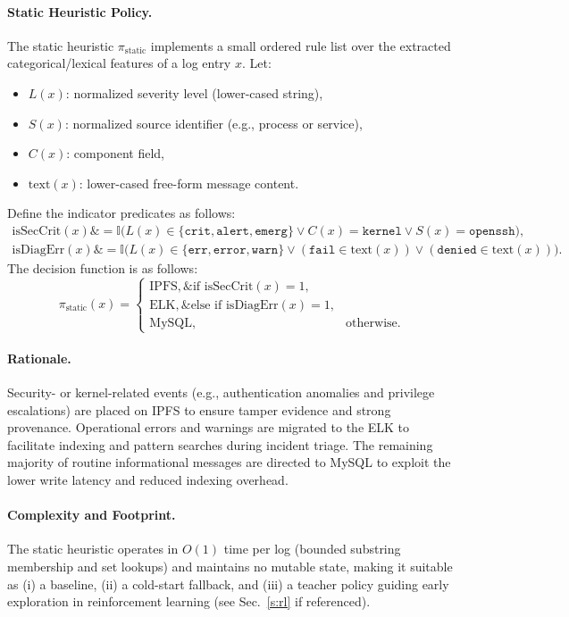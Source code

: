 \paragraph{Static Heuristic Policy.}
The static heuristic $\pi_{\text{static}}$ implements a small ordered rule list over the extracted categorical/lexical features of a log entry $x$. Let:
\begin{itemize}
  \item $L(x)$: normalized severity level (lower-cased string),
  \item $S(x)$: normalized source identifier (e.g., process or service),
  \item $C(x)$: component field,
  \item $\mathrm{text}(x)$: lower-cased free-form message content.
\end{itemize}
Define the indicator predicates as follows:
\[
\begin{aligned}
\mathrm{isSecCrit}(x)\&= \mathbb{I}\big(L(x) \in \{\texttt{crit},\texttt{alert},\texttt{emerg}\} \lor C(x)=\texttt{kernel} \lor S(x)=\texttt{openssh}\big),\\
\mathrm{isDiagErr}(x)\&= \mathbb{I}\big(L(x)\in\{\texttt{err},\texttt{error},\texttt{warn}\} \lor (\texttt{fail} \in \mathrm{text}(x)) \lor (\texttt{denied}\in \mathrm{text}(x))\big).
\end{aligned}
\]
The decision function is as follows:
\[
\pi_{\text{static}}(x) =
\begin{cases}
\text{IPFS},\& \text{if } \mathrm{isSecCrit}(x)=1,\\
\text{ELK}, \& \text{else if } \mathrm{isDiagErr}(x)=1,\\
\text{MySQL},& \text{otherwise}.
\end{cases}
\]

\paragraph{Rationale.}
Security- or kernel-related events (e.g., authentication anomalies and privilege escalations) are placed on IPFS to ensure tamper evidence and strong provenance. Operational errors and warnings are migrated to the ELK to facilitate indexing and pattern searches during incident triage. The remaining majority of routine informational messages are directed to MySQL to exploit the lower write latency and reduced indexing overhead.

\paragraph{Complexity and Footprint.}
The static heuristic operates in $O(1)$ time per log (bounded substring membership and set lookups) and maintains no mutable state, making it suitable as (i) a baseline, (ii) a cold-start fallback, and (iii) a teacher policy guiding early exploration in reinforcement learning (see Sec.~\ref{s:rl} if referenced).

